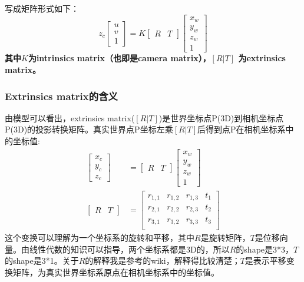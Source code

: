 \documentclass[UTF8]{ctexart}
\begin{document}
写成矩阵形式如下：
\begin{equation}       %
z_c \left[ \begin{array}{c}  u \\ v \\  1 \end{array} \right] =
K \left[ \begin{array}{c|c} R & T   \end{array} \right] \left[ \begin{array}{c}   x_w \\  y_w \\  z_w \\ 1 \end{array}\right]
\end{equation}
\textbf{其中$K$为intrinsics matrix（也即是camera matrix），$[R|T]$ 为extrinsics matrix\cite{wikiCameraresectioning18830}。}
\subsubsection{Extrinsics matrix的含义}
由模型可以看出，extrinsics matrix($[R|T]$)是世界坐标点P(3D)到相机坐标点P(3D)的投影转换矩阵。真实世界点P坐标左乘$[R|T]$后得到点P在相机坐标系中的坐标值:
\begin{align}
 \left[ \begin{array}{c}  x_c \\ y_c \\  z_c \end{array} \right] &=
 \left[ \begin{array}{c|c} R & T   \end{array} \right] \left[ \begin{array}{c}   x_w \\  y_w \\  z_w \\ 1 \end{array}\right]\\
 \left[ \begin{array}{c|c} R & T   \end{array} \right] &=
\left[ \begin{array}{ccc|c}
r_{1,1} & r_{1,2} & r_{1,3} & t_1 \\
r_{2,1} & r_{2,2} & r_{2,3} & t_2 \\
r_{3,1} & r_{3,2} & r_{3,3} & t_3 \\
\end{array} \right]
\end{align}
这个变换可以理解为一个坐标系的旋转和平移，其中$R$是旋转矩阵，$T$是位移向量。由线性代数的知识可以指导，两个坐标系都是3D的，所以$R$的shape是3*3，$T$的shape是3*1。关于$R$的解释我是参考的wiki\cite{wikiRotationmatrix18830}，解释得比较清楚；$T$是表示平移变换矩阵，为真实世界坐标系原点在相机坐标系中的坐标值。
\end{document}
